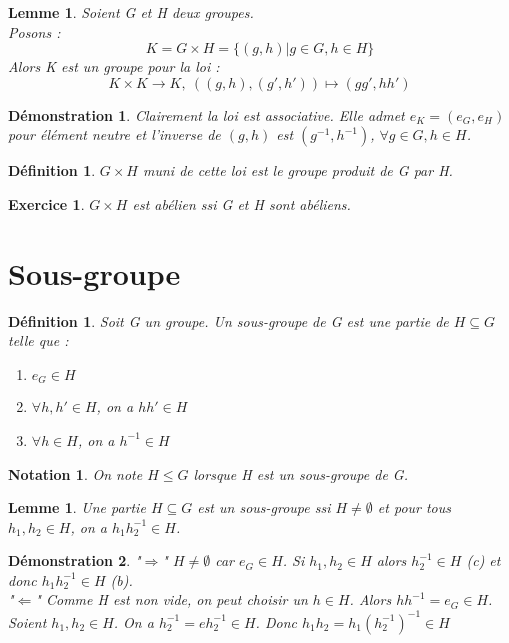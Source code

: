\documentclass[a4paper, oneside]{report}
\theoremstyle{break}
\newtheorem{defi}[thm]{Définition}
\newtheorem{lemme}[thm]{Lemme}
\newtheorem{nota}[thm]{Notation}
\newtheorem*{demo}{Démonstration}
\newtheorem{exo}[thm]{Exercice}
\newcommand{\x}{\times}
\begin{document}
\begin{lemme}
	Soient G et H deux groupes.\\
	Posons :
	$$K=G\x H=\{(g,h)|g\in G, h\in H \}$$
	Alors K est un groupe pour la loi :
	$$K\x K \rightarrow K,~((g,h),(g',h'))\mapsto (gg',hh')$$
\end{lemme}

\begin{demo}
	Clairement la loi est associative. Elle admet $e_K=(e_G,e_H)$ pour élément neutre et l'inverse de $(g,h)$ est $(g^{-1}, h^{-1})$, $\forall g\in G, h\in H$.
\end{demo}

\begin{defi}
	$G\x H$ muni de cette loi est le groupe produit de G par H.
\end{defi}

\begin{exo}
	$G\x H$ est abélien ssi G et H sont abéliens.
\end{exo}

\section{Sous-groupe}

\begin{defi}	
	Soit G un groupe. Un sous-groupe de G est une partie de $H\subseteq G$ telle que :
	\begin{enumerate}
	\item $e_G \in H$
	\item $\forall h,h' \in H$, on a $hh' \in H$
	\item $\forall h\in H$, on a $h^{-1}\in H$
	\end{enumerate}
\end{defi}

\begin{nota}
	On note $H\leq G$ lorsque H est un sous-groupe de G.	
\end{nota}

\begin{lemme}
	Une partie $H\subseteq G$ est un sous-groupe ssi $H\neq \emptyset$ et pour tous $h_1,h_2\in H$, on a $h_1h_2^{-1}\in H$.	
\end{lemme}

\begin{demo}
	"$\Rightarrow$" $H\neq \emptyset$ car $e_G \in H$. Si $h_1,h_2\in H$ alors $h_2^{-1}\in H$ (c) et donc $h_1h_2^{-1}\in H$ (b).\\
	"$\Leftarrow$" Comme H est non vide, on peut choisir un $h\in H$. Alors $hh^{-1}=e_G \in H$. Soient $h_1,h_2 \in H$. On a $h_2^{-1}=eh_2^{-1}\in H$. Donc $h_1h_2=h_1(h_2^{-1})^{-1}\in H$	
\end{demo}
\end{document}
